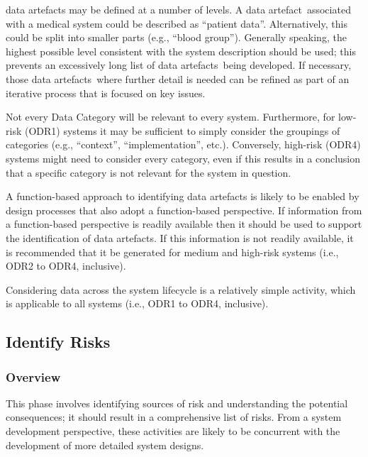 \Glspl{data artefact} may be defined at a number of levels. \cbstart A \gls{data artefact}\cbend\ associated with a medical system could be described as ``patient data''. Alternatively, this could be split into smaller parts (e.g., ``blood group''). Generally speaking, the highest possible level consistent with the system description should be used; this prevents an excessively long list of \cbstart\glspl{data artefact}\cbend\ being developed. If necessary, those \cbstart\glspl{data artefact}\cbend\ where further detail is needed can be refined as part of an iterative process that is focused on key issues.

Not every Data Category will be relevant to every system. Furthermore, for low-risk (ODR1) systems it may be sufficient to simply consider the groupings of categories (e.g., ``context'', ``implementation'', etc.). Conversely, high-risk (ODR4) systems might need to consider every category, even if this results in a conclusion that a specific category is not relevant for the system in question.

A function-based approach to identifying \glspl{data artefact} is likely to be enabled by design processes that also adopt a function-based perspective. If \gls{information} from a function-based perspective is readily available then it should be used to support the identification of \glspl{data artefact}. If this \gls{information} is not readily available, it is recommended that it be generated for medium and high-risk systems (i.e., ODR2 to ODR4, inclusive).

Considering data across the system lifecycle is a relatively simple activity, which is applicable to all systems (i.e., ODR1 to ODR4, inclusive).

\subsection{Identify Risks}
\subsubsection{Overview}
This phase involves identifying sources of risk and understanding the potential consequences; it should result in a comprehensive list of risks. From a system development perspective, these activities are likely to be concurrent with the development of more detailed system designs.

